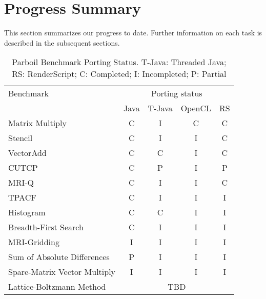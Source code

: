 \section*{Progress Summary}

This section summarizes our progress to date. Further information on each task
is described in the subsequent sections.


\begin{table}[h]\small
\centering
\begin{tabular}{ | l | c | c | c | c |}
    \hline 
    Benchmark & \multicolumn{4}{|c|}{Porting status} \\ \cline{2-5}
              & Java & T-Java & OpenCL & RS \\ \hline
    Matrix Multiply & C & I & C & C \\ \hline
    Stencil & C & I & I & C \\ \hline
    VectorAdd & C & C & I & C \\ \hline
    CUTCP & C & P  & I  & P \\ \hline
    MRI-Q & C & I & I & C \\ \hline
    TPACF & C & I & I & I \\ \hline
    Histogram & C & C & I & I \\ \hline
    Breadth-First Search & C & I & I & I \\ \hline
    MRI-Gridding & I & I & I & I \\ \hline
    Sum of Absolute Differences & P & I & I & I \\ \hline
    Spare-Matrix Vector Multiply & I & I & I & I \\ \hline
    Lattice-Boltzmann Method & \multicolumn{4}{|c|}{TBD} \\ \hline
    \hline
\end{tabular}
\caption{Parboil Benchmark Porting Status. T-Java: Threaded Java; RS:
RenderScript; C: Completed; I: Incompleted; P: Partial}
\label{table:parboil}
\end{table}

